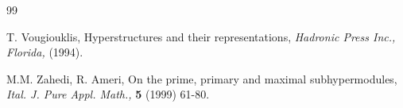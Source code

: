 \documentclass[preprint,review,10pt]{amsart}
\theoremstyle{definition}
\theoremstyle{remark}
\numberwithin{equation}{section}
\begin{document}
\begin{thebibliography}{99}






T. Vougiouklis, Hyperstructures and their representations, {\it Hadronic Press Inc., Florida, }(1994).




M.M. Zahedi, R. Ameri, On the prime, primary and maximal subhypermodules, {\it Ital. J. Pure Appl. Math.,} {\bf 5} (1999) 61-80.

\end{thebibliography}
\end{document}
